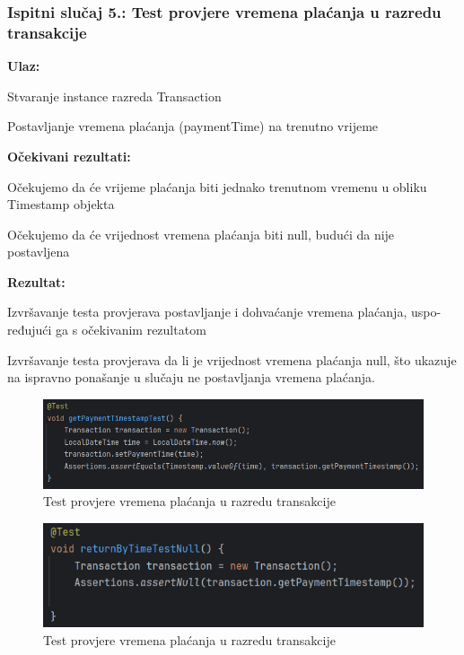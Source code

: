      
			\subsubsection{Ispitni slučaj 5.: Test provjere vremena plaćanja u razredu transakcije}
			
			
			\noindent \textbf{Ulaz:}
			\begin{packed_item}
				\item Stvaranje instance razreda Transaction
				\item Postavljanje vremena plaćanja (paymentTime) na trenutno vrijeme
			\end{packed_item}
			
			\noindent \textbf{Očekivani rezultati:}
			\begin{packed_item}
				\item Očekujemo da će vrijeme plaćanja biti jednako trenutnom vremenu u obliku Timestamp objekta
				\item Očekujemo da će vrijednost vremena plaćanja biti null, budući da nije postavljena
			\end{packed_item}
			\noindent \textbf{Rezultat:}
			\begin{packed_item}
				\item  Izvršavanje testa provjerava postavljanje i dohvaćanje vremena plaćanja, uspo- ređujući ga s očekivanim rezultatom
				\item Izvršavanje testa provjerava da li je vrijednost vremena plaćanja null, što ukazuje na ispravno ponašanje u slučaju ne postavljanja vremena plaćanja.
			\end{packed_item}
			
			\begin{figure} [H]
				\centering
				\includegraphics[width=0.7\linewidth]{slike/TransactionTest.png}
				\caption{Test provjere vremena plaćanja u razredu transakcije}
				\label{fig:Test provjere vremena plaćanja u razredu transakcije}
			\end{figure}
			\begin{figure} [H]
				\centering
				\includegraphics[width=0.7\linewidth]{slike/TransactionTest1.png}
				\caption{Test provjere vremena plaćanja u razredu transakcije}
				\label{fig:Test provjere vremena plaćanja u razredu transakcije}
			\end{figure}

